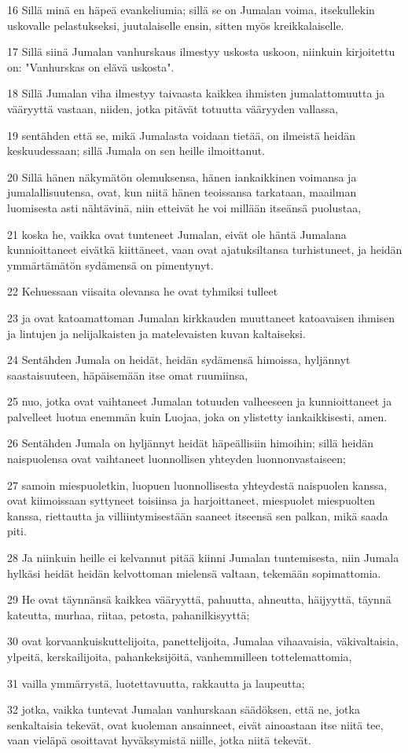\par 16 Sillä minä en häpeä evankeliumia; sillä se on Jumalan voima, itsekullekin uskovalle pelastukseksi, juutalaiselle ensin, sitten myös kreikkalaiselle.
\par 17 Sillä siinä Jumalan vanhurskaus ilmestyy uskosta uskoon, niinkuin kirjoitettu on: "Vanhurskas on elävä uskosta".
\par 18 Sillä Jumalan viha ilmestyy taivaasta kaikkea ihmisten jumalattomuutta ja vääryyttä vastaan, niiden, jotka pitävät totuutta vääryyden vallassa,
\par 19 sentähden että se, mikä Jumalasta voidaan tietää, on ilmeistä heidän keskuudessaan; sillä Jumala on sen heille ilmoittanut.
\par 20 Sillä hänen näkymätön olemuksensa, hänen iankaikkinen voimansa ja jumalallisuutensa, ovat, kun niitä hänen teoissansa tarkataan, maailman luomisesta asti nähtävinä, niin etteivät he voi millään itseänsä puolustaa,
\par 21 koska he, vaikka ovat tunteneet Jumalan, eivät ole häntä Jumalana kunnioittaneet eivätkä kiittäneet, vaan ovat ajatuksiltansa turhistuneet, ja heidän ymmärtämätön sydämensä on pimentynyt.
\par 22 Kehuessaan viisaita olevansa he ovat tyhmiksi tulleet
\par 23 ja ovat katoamattoman Jumalan kirkkauden muuttaneet katoavaisen ihmisen ja lintujen ja nelijalkaisten ja matelevaisten kuvan kaltaiseksi.
\par 24 Sentähden Jumala on heidät, heidän sydämensä himoissa, hyljännyt saastaisuuteen, häpäisemään itse omat ruumiinsa,
\par 25 nuo, jotka ovat vaihtaneet Jumalan totuuden valheeseen ja kunnioittaneet ja palvelleet luotua enemmän kuin Luojaa, joka on ylistetty iankaikkisesti, amen.
\par 26 Sentähden Jumala on hyljännyt heidät häpeällisiin himoihin; sillä heidän naispuolensa ovat vaihtaneet luonnollisen yhteyden luonnonvastaiseen;
\par 27 samoin miespuoletkin, luopuen luonnollisesta yhteydestä naispuolen kanssa, ovat kiimoissaan syttyneet toisiinsa ja harjoittaneet, miespuolet miespuolten kanssa, riettautta ja villiintymisestään saaneet itseensä sen palkan, mikä saada piti.
\par 28 Ja niinkuin heille ei kelvannut pitää kiinni Jumalan tuntemisesta, niin Jumala hylkäsi heidät heidän kelvottoman mielensä valtaan, tekemään sopimattomia.
\par 29 He ovat täynnänsä kaikkea vääryyttä, pahuutta, ahneutta, häijyyttä, täynnä kateutta, murhaa, riitaa, petosta, pahanilkisyyttä;
\par 30 ovat korvaankuiskuttelijoita, panettelijoita, Jumalaa vihaavaisia, väkivaltaisia, ylpeitä, kerskailijoita, pahankeksijöitä, vanhemmilleen tottelemattomia,
\par 31 vailla ymmärrystä, luotettavuutta, rakkautta ja laupeutta;
\par 32 jotka, vaikka tuntevat Jumalan vanhurskaan säädöksen, että ne, jotka senkaltaisia tekevät, ovat kuoleman ansainneet, eivät ainoastaan itse niitä tee, vaan vieläpä osoittavat hyväksymistä niille, jotka niitä tekevät.

